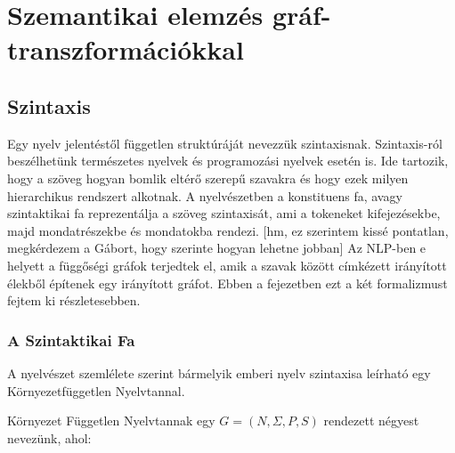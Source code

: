 \chapter{Szemantikai elemzés gráf-transzformációkkal}
\label{sec:SemParsWithGraphTrans}
\section{Szintaxis}
Egy nyelv jelentéstől független struktúráját nevezzük szintaxisnak. Szintaxis-ról beszélhetünk természetes nyelvek és programozási nyelvek esetén is. Ide tartozik, hogy a szöveg hogyan bomlik eltérő szerepű szavakra és hogy ezek milyen hierarchikus rendszert alkotnak. A nyelvészetben a konstituens fa, avagy szintaktikai fa reprezentálja a szöveg szintaxisát, ami a tokeneket kifejezésekbe, majd mondatrészekbe és mondatokba rendezi. [hm, ez szerintem kissé pontatlan, megkérdezem a Gábort, hogy szerinte hogyan lehetne jobban] Az NLP-ben e helyett a függőségi gráfok terjedtek el, amik a szavak között címkézett irányított élekből építenek egy irányított gráfot. Ebben a fejezetben ezt a két formalizmust fejtem ki részletesebben.

\subsection{A Szintaktikai Fa}
A nyelvészet szemlélete szerint bármelyik emberi nyelv szintaxisa leírható egy Környezetfüggetlen Nyelvtannal.

Környezet Független Nyelvtannak egy $G=(N,\Sigma ,P,S)$ rendezett négyest nevezünk, ahol:

